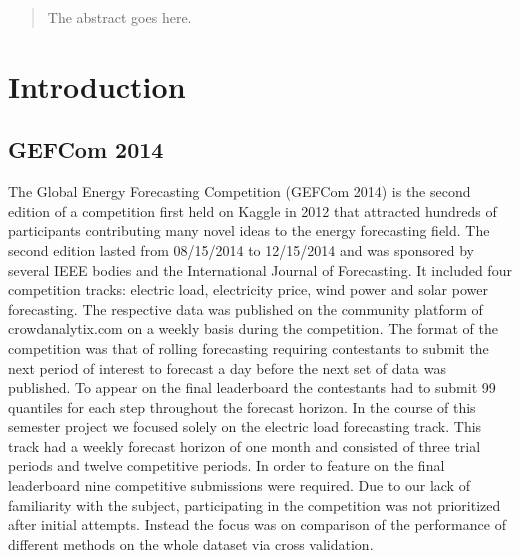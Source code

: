 \documentclass[conference]{IEEEtran}
\begin{document}
\begin{abstract}
The abstract goes here.
\end{abstract}


%
\IEEEpeerreviewmaketitle

\section{Introduction}
\subsection{GEFCom 2014}
The Global Energy Forecasting Competition (GEFCom 2014) is the second edition of a competition first held on Kaggle in 2012 that attracted hundreds of participants contributing many novel ideas to the energy forecasting field. The second edition lasted from 08/15/2014 to 12/15/2014 and was sponsored by several IEEE bodies and the International Journal of Forecasting. It included four competition tracks: electric load, electricity price, wind power and solar power forecasting. The respective data was published on the community platform of crowdanalytix.com on a weekly basis during the competition. The format of the competition was that of rolling forecasting requiring contestants to submit the next period of interest to forecast a day before the next set of data was published. To appear on the final leaderboard the contestants had to submit 99 quantiles for each step throughout the forecast horizon. In the course of this semester project we focused solely on the electric load forecasting track. This track had a weekly forecast horizon of one month and consisted of three trial periods and twelve competitive periods. In order to feature on the final leaderboard nine competitive submissions were required. Due to our lack of familiarity with the subject, participating in the competition was not prioritized after initial attempts. Instead the focus was on comparison of the performance of different methods on the whole dataset via cross validation.
\end{document}
